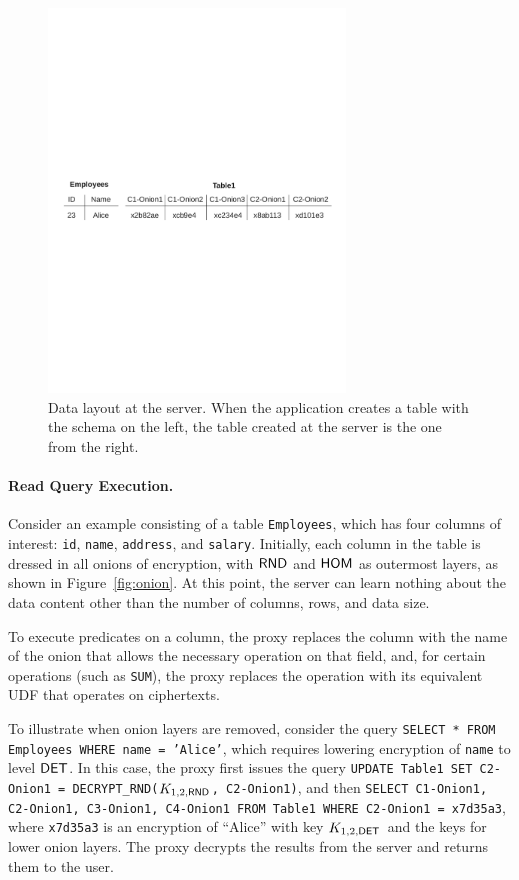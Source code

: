 \begin{figure}[t!] 
\centering
\includegraphics[width=3.1in]{fig/schema.pdf}
\vspace{-0.2in}
\caption{Data layout at the server. When the application creates a
  table with the schema on the left, the table created at the server
  is the one from the right.}
\label{fig:schema}
\end{figure}


\paragraph{Read Query Execution.}

Consider an example consisting of a table \texttt{Employees}, which
has four columns of interest: \texttt{id}, \texttt{name},
\texttt{address}, and {\tt salary}.  Initially, each column in the
table is dressed in all onions of encryption, with $\mathsf{RND}$ and $\mathsf{HOM}$
as outermost layers, as shown in Figure~\ref{fig:onion}.  At this
point, the server can learn nothing about the data content other than
the number of columns, rows, and data size.

To execute predicates on a column, the proxy replaces the column with the
name of the onion that allows the necessary operation on
that field, and, for certain operations (such as {\tt SUM}), the proxy
replaces the operation with its equivalent UDF that operates on
ciphertexts.  

To illustrate when onion layers are removed, consider the query
\texttt{SELECT * FROM Employees WHERE name = 'Alice'}, which requires
lowering encryption of {\tt name} to level $\mathsf{DET}$\@.  In this case,
the proxy first issues the query \texttt{UPDATE Table1 SET C2-Onion1 =
  DECRYPT\_RND($K_{1,2,\mathsf{RND}}$, C2-Onion1)}, and then \texttt{SELECT
  C1-Onion1, C2-Onion1, C3-Onion1, C4-Onion1 FROM Table1 WHERE
  C2-Onion1 = x7d35a3}, where \texttt{x7d35a3} is an encryption of
``Alice'' with key $K_{1,2,\mathsf{DET}}$\ and the keys for lower onion layers.  The proxy decrypts the results
from the server and returns them to the user.

